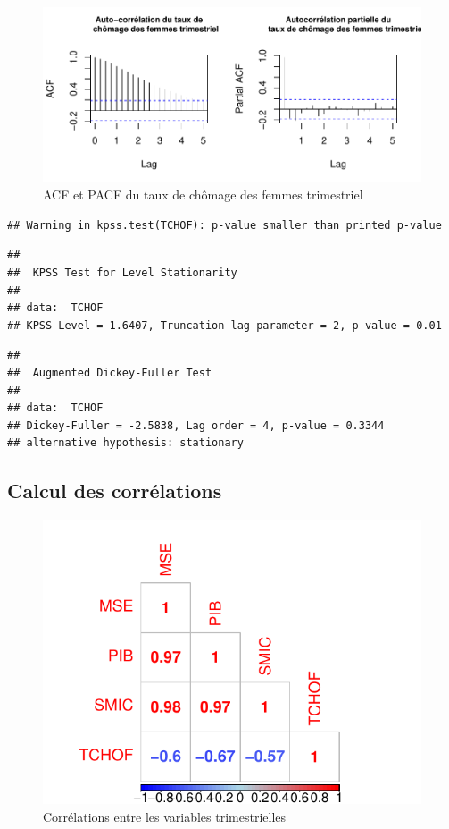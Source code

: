 \documentclass[11pt,]{article}
\begin{document}
\begin{figure}[htbp]
\centering
\includegraphics{Rapport_final_files/figure-latex/unnamed-chunk-8-1.pdf}
\caption{\label{fig8} ACF et PACF du taux de chômage des femmes
trimestriel}
\end{figure}

\begin{verbatim}
## Warning in kpss.test(TCHOF): p-value smaller than printed p-value
\end{verbatim}

\begin{verbatim}
## 
##  KPSS Test for Level Stationarity
## 
## data:  TCHOF
## KPSS Level = 1.6407, Truncation lag parameter = 2, p-value = 0.01
\end{verbatim}

\begin{verbatim}
## 
##  Augmented Dickey-Fuller Test
## 
## data:  TCHOF
## Dickey-Fuller = -2.5838, Lag order = 4, p-value = 0.3344
## alternative hypothesis: stationary
\end{verbatim}

\subsection{Calcul des corrélations}\label{calcul-des-correlations}

\begin{figure}[htbp]
\centering
\includegraphics{Rapport_final_files/figure-latex/unnamed-chunk-9-1.pdf}
\caption{\label{fig9} Corrélations entre les variables trimestrielles}
\end{figure}
\end{document}
